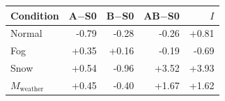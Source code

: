 \begin{tabular}{|l|r|r|r|r|}
\hline
Condition & A$-$S0 & B$-$S0 & AB$-$S0 & $I$ \\
\hline
Normal & -0.79 & -0.28 & -0.26 & +0.81 \\
Fog & +0.35 & +0.16 & -0.19 & -0.69 \\
Snow & +0.54 & -0.96 & +3.52 & +3.93 \\
$M_{\mathrm{weather}}$ & +0.45 & -0.40 & +1.67 & +1.62 \\
\hline
\end{tabular}

